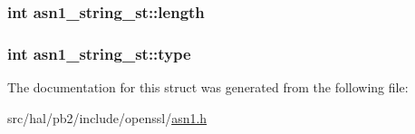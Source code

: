 \subsubsection[{\texorpdfstring{length}{length}}]{\setlength{\rightskip}{0pt plus 5cm}int asn1\+\_\+string\+\_\+st\+::length}\hypertarget{structasn1__string__st_a425b332bd4925320832bb18c59f6a9df}{}\label{structasn1__string__st_a425b332bd4925320832bb18c59f6a9df}
\subsubsection[{\texorpdfstring{type}{type}}]{\setlength{\rightskip}{0pt plus 5cm}int asn1\+\_\+string\+\_\+st\+::type}\hypertarget{structasn1__string__st_a4bc5c5a5d5cd42ec6108e8bef50e09ad}{}\label{structasn1__string__st_a4bc5c5a5d5cd42ec6108e8bef50e09ad}


The documentation for this struct was generated from the following file\+:\begin{DoxyCompactItemize}
\item 
src/hal/pb2/include/openssl/\hyperlink{asn1_8h}{asn1.\+h}\end{DoxyCompactItemize}
